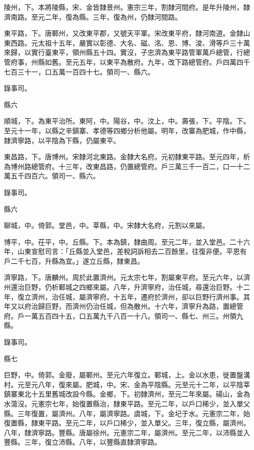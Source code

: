 \begin{pinyinscope}
 陵州，下。本將陵縣，宋、金皆隸景州。憲宗三年，割隸河間府。是年升陵州，隸濟南路。至元二年，復為縣。三年，復為州，仍隸河間路。



 東平路，下。唐鄆州，又改東平郡，又號天平軍。宋改東平府，隸河南道。金隸山東西路。元太祖十五年，嚴實以彰德、大名、磁、洺、恩、博、浚、滑等戶三十萬來歸，以實行臺東平，領州縣五十四。實沒，子忠濟為東平路管軍萬戶總管，行總管府事，州縣如舊。至元五年，以東平為散府。九年，改下路總管府。戶四萬四千七百三十一，口五萬一百四十七。領司一、縣六。



 錄事司。



 縣六



 順城，下。為東平治所。東阿，中。陽谷，中。汶上，中。壽張，下。平陰。下。至元十一年，以縣之辛鎮寨、孝德等四鄉分析他屬。明年，改寨為肥城，作中縣，隸濟寧路，以平陰為下縣，仍屬東平。



 東昌路，下。唐博州。宋隸河北東路。金隸大名府。元初隸東平路。至元四年，析為博州路總管府。十三年，改東昌路，仍置總管府。戶三萬三千一百二，口一十二萬五千四百六。領司一、縣六。



 錄事司。



 縣六



 聊城，中。倚郭。堂邑，中。莘縣，中。宋隸大名府，元割以來屬。



 博平，中。茌平，中。丘縣。下。本為鎮，隸曲周。至元二年，並入堂邑。二十六年，山東宣慰司言：「丘縣並入堂邑，差稅詞訴相去二百餘里，往復非便。平恩有戶二千七百，升縣為宜。」遂立丘縣，隸東昌。



 濟寧路，下。唐麟州。周於此置濟州。元太宗七年，割屬東平府。至元六年，以濟州還治巨野，仍析鄆城之四鄉來屬。八年，升濟寧府，治任城，尋還治巨野。十二年，復立濟州，治任城，屬濟寧府。十五年，遷府於濟州，卻以巨野行濟州事。其年又以府治歸巨野，而濟州仍治任城，但為散州。十六年，濟寧升為路，置總管府。戶一萬五百四十五，口五萬九千八百一十八。領司一、縣七、州三。州領九縣。



 錄事司。



 縣七



 巨野，中。倚郭。金廢，屬鄆州。至元六年復立。鄆城，上。金以水患，徙置盤溝村。元至元八年，復來屬。肥城，中。宋、金為平陰縣。元至元十二年，以平陰莘鎮寨東北十五里舊城改設今縣。金鄉，下。初隸濟州，至元二年來屬。碭山，金為水蕩沒。元憲宗七年，始復置縣治，隸東平路。至元二年，以戶口稀少，並入單父縣。三年復置，屬濟州。八年，屬濟寧路。虞城，下。金圮于水。元憲宗二年，始復置縣，隸東平路。至元二年，以戶口稀少，並入單父。三年，復立縣，屬濟州。八年，隸濟寧路。豐縣。唐屬徐州。元憲宗二年，屬濟州。至元二年，以沛縣並入豐縣。三年，復立沛縣。八年，以豐縣直隸濟寧路。




\end{pinyinscope}
